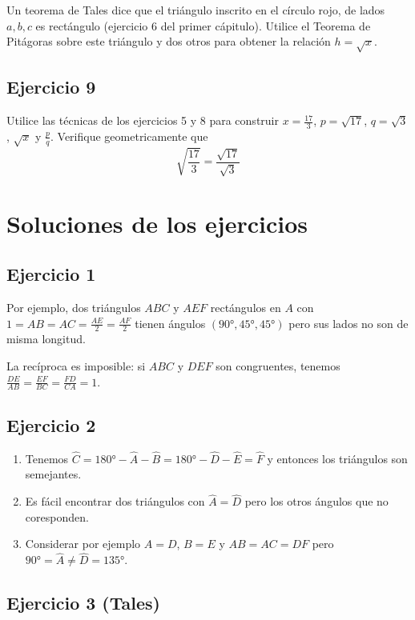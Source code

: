 Un teorema de Tales dice que el triángulo inscrito en el círculo rojo,
de lados $a, b, c$ es rectángulo (ejercicio 6 del primer cápitulo).
Utilice el Teorema de Pitágoras sobre este
triángulo y dos otros para obtener la relación $h = \sqrt{x}$.

\subsection{Ejercicio 9}

Utilice las técnicas de los ejercicios 5 y 8 para construir
$x = \frac{17}{3}$, $p = \sqrt{17}$, $q = \sqrt{3}$, $\sqrt{x}$ y $\frac{p}{q}$.
Verifique geometricamente que 
$$
\sqrt{\frac{17}{3}} = \frac{\sqrt{17}}{\sqrt{3}}
$$

\section{Soluciones de los ejercicios}

\subsection{Ejercicio 1}

Por ejemplo, dos triángulos $ABC$ y $AEF$ rectángulos en $A$ con
$1 = {AB} = {AC} = \frac{AE}{2} = \frac{AF}{2}$ tienen ángulos
$(90°, 45°, 45°)$ pero sus lados no son de misma longitud.

La recíproca es imposible: si $ABC$ y $DEF$ son congruentes, tenemos
$\frac{DE}{AB} = \frac{EF}{BC} = \frac{FD}{CA} = 1$.

\subsection{Ejercicio 2}

\begin{enumerate}
\item Tenemos
  $\widehat{C} = {180° - \widehat{A} - \widehat{B}} =
  {180° - \widehat{D} - \widehat{E}} = \widehat{F}$ y entonces
  los triángulos son semejantes.
\item Es fácil encontrar dos triángulos con $\widehat{A} = \widehat{D}$
  pero los otros ángulos que no coresponden.
\item Considerar por ejemplo $A = D$, $B = E$ y $AB = AC = DF$ pero
  $90° = \widehat{A} \neq \widehat{D} = 135°$.
\end{enumerate}

\subsection{Ejercicio 3 (Tales)}

